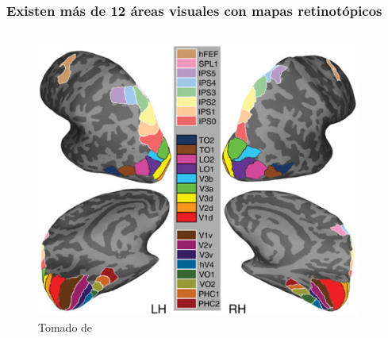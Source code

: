 \documentclass[
11pt, %
%
aspectratio=169, %
]{beamer}
\begin{document}
\begin{frame}
	\frametitle{Existen m\'as de 12 \'areas visuales con mapas retinot\'opicos}
	\begin{columns}[c] %
	\begin{column}{0.7\textwidth} %
	\begin{figure}
			\includegraphics[scale=0.55]{Graphics/brain_wang}
		\captionsetup{font=tiny}
		\caption{Tomado de \cite{wang_probabilistic_2015}}
	\end{figure}	
		
	\end{column}
	
	\begin{column}{0.3\textwidth}
		
	\end{column}
	
	
\end{columns}
	
	

\end{frame}
\end{document}
